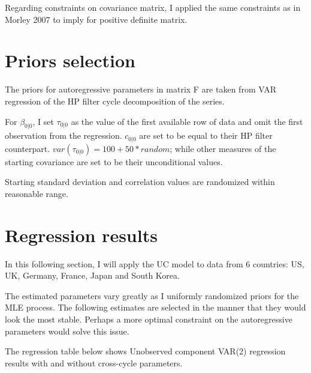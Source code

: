 \documentclass[fleqn]{article}
\begin{document}
\begin{outline}[enumerate]
\vspace{5mm} %

Regarding constraints on covariance matrix, I applied the same constraints as in Morley 2007 to imply for positive definite matrix.


\section{Priors selection}

The priors for autoregressive parameters in matrix F are taken from VAR regression of the HP filter cycle decomposition of the series.

For $\beta_{0|0}$, I set $\tau_{0|0}$ as the value of the first available row of data and omit the first observation from the regression. $c_{0|0}$ are set to be equal to their HP filter counterpart. $var(\tau_{0|0}) =100+50*random$; while other measures of the starting covariance are set to be their unconditional values.

Starting standard deviation and correlation values are randomized within reasonable range.

		
		
		\section{Regression results}
		
		In this following section, I will apply the UC model to data from 6 countries: US, UK, Germany, France, Japan and South Korea.
		
		The estimated parameters vary greatly as I uniformly randomized priors for the MLE process. The following estimates are selected in the manner that they would look the most stable. Perhaps a more optimal constraint on the autoregressive parameters would solve this issue.
		
		The regression table below shows Unobserved component VAR(2) regression results with and without cross-cycle parameters.
		
		\pagebreak
		
		
		\begin{landscape}
			

\end{landscape}
\end{outline}
\end{document}
